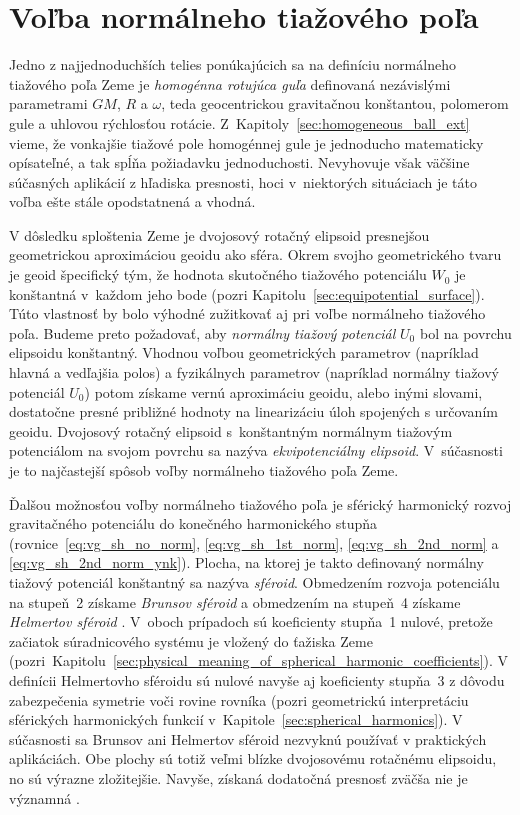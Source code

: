 \documentclass[a4paper,12pt]{book}
\begin{document}
\section{Voľba normálneho tiažového poľa}

Jedno z najjednoduchších telies ponúkajúcich sa na definíciu normálneho 
tiažového poľa Zeme je \emph{homogénna rotujúca guľa} definovaná nezávislými 
parametrami $GM$, $R$ a $\omega$, teda geocentrickou gravitačnou konštantou, 
polomerom gule a uhlovou rýchlosťou rotácie.  
Z~Kapitoly~\ref{sec:homogeneous_ball_ext} vieme, že vonkajšie tiažové pole 
homogénnej gule je jednoducho matematicky opísateľné, a tak spĺňa požiadavku 
jednoduchosti.  Nevyhovuje však väčšine súčasných aplikácií z hľadiska 
presnosti, hoci v~niektorých situáciach je táto voľba ešte stále opodstatnená 
a vhodná.

V dôsledku sploštenia Zeme je dvojosový rotačný elipsoid presnejšou 
geometrickou aproximáciou geoidu ako sféra.  Okrem svojho geometrického tvaru 
je geoid špecifický tým, že hodnota skutočného tiažového potenciálu $W_0$ je 
konštantná v~každom jeho bode (pozri Kapitolu~\ref{sec:equipotential_surface}).  
Túto vlastnosť by bolo výhodné zužitkovať aj pri voľbe normálneho tiažového 
poľa.  Budeme preto požadovať, aby \emph{normálny tiažový potenciál} $U_0$ bol 
na povrchu elipsoidu konštantný.  Vhodnou voľbou geometrických parametrov 
(napríklad hlavná a vedľajšia polos) a fyzikálnych parametrov (napríklad 
normálny tiažový potenciál $U_0$) potom získame vernú aproximáciu geoidu, alebo 
inými slovami, dostatočne presné približné hodnoty na linearizáciu úloh 
spojených s určovaním geoidu.  Dvojosový rotačný elipsoid s~konštantným 
normálnym tiažovým potenciálom na svojom povrchu sa nazýva 
\emph{ekvipotenciálny elipsoid}.  V~súčasnosti je to najčastejší spôsob voľby 
normálneho tiažového poľa Zeme.

Ďalšou možnosťou voľby normálneho tiažového poľa je sférický harmonický rozvoj 
gravitačného potenciálu do konečného harmonického stupňa 
(rovnice~\ref{eq:vg_sh_no_norm}, \ref{eq:vg_sh_1st_norm}, 
\ref{eq:vg_sh_2nd_norm} a \ref{eq:vg_sh_2nd_norm_ynk}).  Plocha, na ktorej je 
takto definovaný normálny tiažový potenciál konštantný sa nazýva 
\emph{sféroid}.  Obmedzením rozvoja potenciálu na stupeň~2 získame 
\emph{Brunsov sféroid} a obmedzením na stupeň~4 získame \emph{Helmertov 
sféroid} \parencite{Moritz1967}.  V~oboch prípadoch sú koeficienty stupňa~1 
nulové, pretože začiatok súradnicového systému je vložený do ťažiska Zeme 
(pozri~Kapitolu~\ref{sec:physical_meaning_of_spherical_harmonic_coefficients}).  
V definícii Helmertovho sféroidu sú nulové navyše aj koeficienty stupňa~3 
z dôvodu zabezpečenia symetrie voči rovine rovníka (pozri geometrickú 
interpretáciu sférických harmonických funkcií 
v~Kapitole~\ref{sec:spherical_harmonics}).  V súčasnosti sa Brunsov ani 
Helmertov sféroid nezvyknú používať v praktických aplikáciách.  Obe plochy sú 
totiž veľmi blízke dvojosovému rotačnému elipsoidu, no sú výrazne zložitejšie.  
Navyše, získaná dodatočná presnosť zväčša nie je významná 
\parencite{Moritz1967}.
\end{document}
